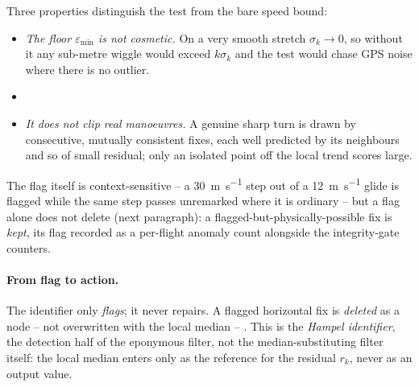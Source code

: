 Three properties distinguish the test from the bare speed bound:
\begin{itemize}[itemsep=2pt, topsep=3pt]
  \item \emph{The floor $\varepsilon_{\min}$ is not cosmetic.} On a very smooth stretch
        $\sigma_k\to 0$, so without it any sub-metre wiggle would exceed $k\sigma_k$ and
        the test would chase GPS noise where there is no outlier.
  \item {}
  \item \emph{It does not clip real manoeuvres.} A genuine sharp turn is drawn by
        consecutive, mutually consistent fixes, each well predicted by its neighbours and
        so of small residual; only an isolated point off the local trend scores large.
\end{itemize}
The flag itself is context-sensitive -- a \SI{30}{\metre\per\second} step out of a
\SI{12}{\metre\per\second} glide is flagged while the same step passes unremarked where it
is ordinary -- but a flag alone does not delete (next paragraph): a
flagged-but-physically-possible fix is \emph{kept}, its flag recorded as a per-flight
anomaly count alongside the integrity-gate counters. 

\paragraph{From flag to action.} The identifier only
\emph{flags}; it never repairs. A flagged horizontal fix is \emph{deleted} as a node -- not
overwritten with the local median -- . This is
the \emph{Hampel identifier}, the detection half of the eponymous filter, not
the median-substituting filter itself: the local median enters only as the reference
for the residual $r_k$, never as an output value.

